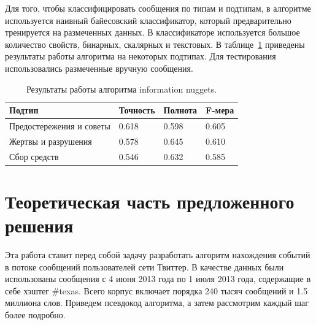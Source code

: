 \documentclass[12pt, a4paper]{article}
\begin{document}
	Для того, чтобы классифицировать сообщения по типам и подтипам, в алгоритме используется наивный байесовский классификатор, который предварительно тренируется на размеченных данных. В классификаторе используется большое количество свойств, бинарных, скалярных и текстовых. В таблице~\ref{nuggets-table} приведены результаты работы алгоритма на некоторых подтипах. Для тестирования использовались размеченные вручную сообщения.
	\begin{table}[h]
	\centering
	\begin{tabular}{ l l l l}
	Подтип & Точность & Полнота & F-мера \\ \hline
	Предостережения и советы & 0.618 & 0.598 & 0.605 \\ 
	Жертвы и разрушения & 0.578 & 0.645 & 0.610 \\ 
	Сбор средств & 0.546 & 0.632 & 0.585 \\ \hline
	\end{tabular}
	\caption{Результаты работы алгоритма information nuggets.}
	\label{nuggets-table}
	\end{table}
  
  \section{Теоретическая часть предложенного решения}
  Эта работа ставит перед собой задачу разработать алгоритм нахождения событий в потоке сообщений пользователей сети Твиттер. В качестве данных были использованы сообщения с 4 июня 2013 года по 1 июля 2013 года, содержащие в себе хэштег \#texas. Всего корпус включает порядка 240 тысяч сообщений и 1.5 миллиона слов. Приведем псевдокод алгоритма, а затем рассмотрим каждый шаг более подробно. 
  
\end{document}
